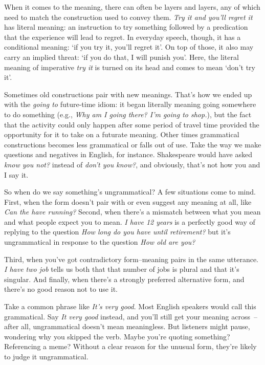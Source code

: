 When it comes to the meaning, there can often be layers and layers, any of which need to match the construction used to convey them. \textit{Try it and you'll regret it} has literal meaning: an instruction to try something followed by a predication that the experience will lead to regret. In everyday speech, though, it has a conditional meaning: `if you try it, you'll regret it'. On top of those, it also may carry an implied threat: `if you do that, I will punish you'. Here, the literal meaning of imperative \textit{try it} is turned on its head and comes to mean `don't try it'.

Sometimes old constructions pair with new meanings. That's how we ended up with the \textit{going to} future-time idiom: it began literally meaning going somewhere to do something (e.g., \textit{Why am I going there? I'm going to shop.}), but the fact that the activity could only happen after some period of travel time provided the opportunity for it to take on a futurate meaning. Other times grammatical constructions becomes less grammatical or falls out of use. Take the way we make questions and negatives in English, for instance. Shakespeare would have asked \textit{know you not?} instead of \textit{don't you know?}, and obviously, that's not how you and I say it.



So when do we say something's ungrammatical? A few situations come to mind. First, when the form doesn't pair with or even suggest any meaning at all, like \textit{Can the have running?} Second, when there's a mismatch between what you mean and what people expect you to mean. \textit{I have 12 years} is a perfectly good way of replying to the question \textit{How long do you have until retirement?} but it's ungrammatical in response to the question \textit{How old are you?}


Third, when you've got contradictory form--meaning pairs in the same utterance. \textit{I have two job} tells us both that that number of jobs is plural and that it's singular. And finally, when there's a strongly preferred alternative form, and there's no good reason not to use it.

Take a common phrase like \textit{It's very good}. Most English speakers would call this grammatical. Say \textit{It very good} instead, and you'll still get your meaning across~-- after all, ungrammatical doesn't mean meaningless. But listeners might pause, wondering why you skipped the verb. Maybe you're quoting something? Referencing a meme? Without a clear reason for the unusual form, they're likely to judge it ungrammatical.

